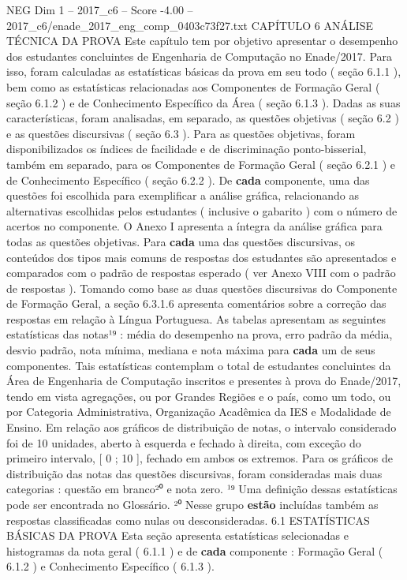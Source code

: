 \begin{textsample}{NEG Dim 1 – 2017\_c6 – Score -4.00 – 2017\_c6/enade\_2017\_eng\_comp\_0403c73f27.txt}  \label{ex:f1_neg_150}
CAPÍTULO 6 ANÁLISE TÉCNICA DA PROVA Este capítulo tem por objetivo apresentar o desempenho dos estudantes concluintes de Engenharia de Computação no Enade/2017.
Para isso, foram calculadas as estatísticas básicas da prova em seu todo ( seção 6.1.1 ), bem como as estatísticas relacionadas aos Componentes de Formação Geral ( seção 6.1.2 ) e de Conhecimento Específico da Área ( seção 6.1.3 ).
Dadas as suas características, foram analisadas, em separado, as questões objetivas ( seção 6.2 ) e as questões discursivas ( seção 6.3 ).
Para as questões objetivas, foram disponibilizados os índices de facilidade e de discriminação ponto-bisserial, também em separado, para os Componentes de Formação Geral ( seção 6.2.1 ) e de Conhecimento Específico ( seção 6.2.2 ).
De \textbf{cada} componente, uma das questões foi escolhida para exemplificar a análise gráfica, relacionando as alternativas escolhidas pelos estudantes ( inclusive o gabarito ) com o número de acertos no componente.
O Anexo I apresenta a íntegra da análise gráfica para todas as questões objetivas.
Para \textbf{cada} uma das questões discursivas, os conteúdos dos tipos mais comuns de respostas dos estudantes são apresentados e comparados com o padrão de respostas esperado ( ver Anexo VIII com o padrão de respostas ).
Tomando como base as duas questões discursivas do Componente de Formação Geral, a seção 6.3.1.6 apresenta comentários sobre a correção das respostas em relação à Língua Portuguesa.
As tabelas apresentam as seguintes estatísticas das notas¹⁹ : média do desempenho na prova, erro padrão da média, desvio padrão, nota mínima, mediana e nota máxima para \textbf{cada} um de seus componentes.
Tais estatísticas contemplam o total de estudantes concluintes da Área de Engenharia de Computação inscritos e presentes à prova do Enade/2017, tendo em vista agregações, ou por Grandes Regiões e o país, como um todo, ou por Categoria Administrativa, Organização Acadêmica da IES e Modalidade de Ensino.
Em relação aos gráficos de distribuição de notas, o intervalo considerado foi de 10 unidades, aberto à esquerda e fechado à direita, com exceção do primeiro intervalo, [ 0 ; 10 ], fechado em ambos os extremos.
Para os gráficos de distribuição das notas das questões discursivas, foram consideradas mais duas categorias : questão em branco²⁰ e nota zero. ¹⁹ Uma definição dessas estatísticas pode ser encontrada no Glossário. ²⁰ Nesse grupo \textbf{estão} incluídas também as respostas classificadas como nulas ou desconsideradas. 6.1 ESTATÍSTICAS BÁSICAS DA PROVA Esta seção apresenta estatísticas selecionadas e histogramas da nota geral ( 6.1.1 ) e de \textbf{cada} componente : Formação Geral ( 6.1.2 ) e Conhecimento Específico ( 6.1.3 ).

\end{textsample}
